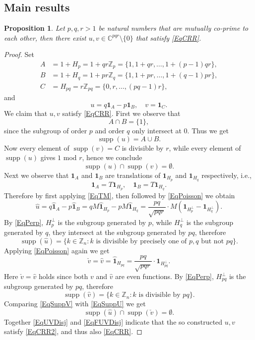 \documentclass[A4,11pt]{article}
\DeclareMathOperator{\supp}{supp}
\newcommand{\F}[1]{\widehat{\mathbf 1}_{#1}}
\newtheorem{Prop}{Proposition}
\begin{document}
\subsection{Main results}
\begin{Prop} \label{PropPQR}
Let $p,q,r>1$ be natural numbers that are mutually co-prime to each other, then there exist $u,v\in\mathbb C^{pqr}\setminus\{0\}$ that satisfy \eqref{EqCRR}.
\end{Prop}

\begin{proof}
Set
\begin{align*}
A&=1+H_p=1+qr\mathbb Z_p=\{1,1+qr,\ldots,1+(p-1)qr\}, \\
B&=1+H_q=1+pr\mathbb Z_q=\{1,1+pr,\ldots,1+(q-1)pr\}, \\
C&=H_{pq}=r\mathbb Z_{pq}=\{0,r,\ldots,(pq-1)r\},
\end{align*}
and
$$u=q\mathbf 1_A-p\mathbf 1_B, \quad v=\mathbf 1_C.$$
We claim that $u,v$ satisfy \eqref{EqCRR}. First we observe that 
$$A\cap B=\{1\},$$
since the subgroup of order $p$ and order $q$ only intersect at $0$. Thus we get 
$$\supp(u)=A\cup B.$$
Now every element of $\supp(v)=C$ is divisible by $r$, while every element of $\supp(u)$ gives $1$ mod $r$, hence we conclude
\begin{equation} \label{EqUVDisj}
\supp(u)\cap\supp(v)=\emptyset.
\end{equation} 
Next we observe that $\mathbf 1_A$ and $\mathbf 1_B$ are translations of $\mathbf 1_{H_p}$ and $\mathbf 1_{H_q}$ respectively, i.e.,
$$\mathbf 1_A=T\mathbf 1_{H_p}, \quad \mathbf 1_B=T\mathbf 1_{H_q}.$$
Therefore by first applying \eqref{EqTM}, then followed by \eqref{EqPoisson} we obtain
$$\hat u=q\F{A}-p\F{B}=qM\F{H_p}-pM\F{H_q}=\frac{pq}{\sqrt{pqr}}\cdot M(\mathbf 1_{H_p^{\perp}}-\mathbf 1_{H_q^{\perp}}).$$
By \eqref{EqPerp}, $H_p^{\perp}$ is the subgroup generated by $p$, while $H_q^{\perp}$ is the subgroup generated by $q$, they intersect at the subgroup generated by $pq$, therefore
\begin{equation} \label{EqSuppU}
\supp(\hat u)=\{k\in\mathbb Z_n: k \text{ is divisible by precisely one of } p,q \text{ but not } pq\}.
\end{equation}
Applying \eqref{EqPoisson} again we get
$$\check v=\hat v=\F{H_{pq}}=\frac{pq}{\sqrt{pqr}}\cdot \mathbf 1_{H_{pq}^{\perp}}.$$
Here $\check v=\hat v$ holds since both $v$ and $\hat v$ are even functions. By \eqref{EqPerp}, $H_{pq}^{\perp}$ is the subgroup generated by $pq$, therefore
\begin{equation} \label{EqSuppV}
\supp(\hat v)=\{k\in\mathbb Z_n: k \text{ is divisible by } pq\}.
\end{equation} 
Comparing \eqref{EqSuppV} with \eqref{EqSuppU} we get
\begin{equation} \label{EqFUVDisj}
\supp(\hat u)\cap\supp(\check v)=\emptyset.
\end{equation} 
Together \eqref{EqUVDisj} and \eqref{EqFUVDisj} indicate that the so constructed $u,v$ satisfy \eqref{EqCRR2}, and thus also \eqref{EqCRR}. 
\end{proof}
\end{document}
